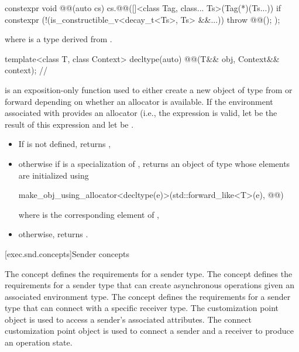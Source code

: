 \pnum
{}
\begin{codeblock}
constexpr void @@(auto cs) {
  cs.@@([]<class Tag, class... Ts>(Tag(*)(Ts...)) {
    if constexpr (!(is_constructible_v<decay_t<Ts>, Ts> &&...))
      throw @@();
  });
}
\end{codeblock}
where  is
a type derived from .

\begin{itemdecl}
template<class T, class Context>
  decltype(auto) @@(T&& obj, Context&& context);       // \expos
\end{itemdecl}

\begin{itemdescr}
\pnum
{} is an exposition-only function used to
either create a new object of type  from 
or forward  depending on whether an allocator is available.
If the environment associated with  provides an allocator
(i.e., the expression  is valid,
let  be the result of this expression
and let  be .

\pnum
\returns
\begin{itemize}
\item
If  is not defined, returns ,
\item
otherwise if  is a specialization of ,
returns an object of type  whose elements are initialized using
\begin{codeblock}
make_obj_using_allocator<decltype(e)>(std::forward_like<T>(e), @@)
\end{codeblock}
where  is the corresponding element of ,
\item
otherwise, returns .
\end{itemize}
\end{itemdescr}

[exec.snd.concepts]{Sender concepts}

\pnum
The  concept defines
the requirements for a sender type.
The  concept defines
the requirements for a sender type
that can create asynchronous operations given an associated environment type.
The  concept defines
the requirements for a sender type
that can connect with a specific receiver type.
The  customization point object is used to access
a sender's associated attributes.
The connect customization point object is used to connect
a sender and a receiver to produce an operation state.

